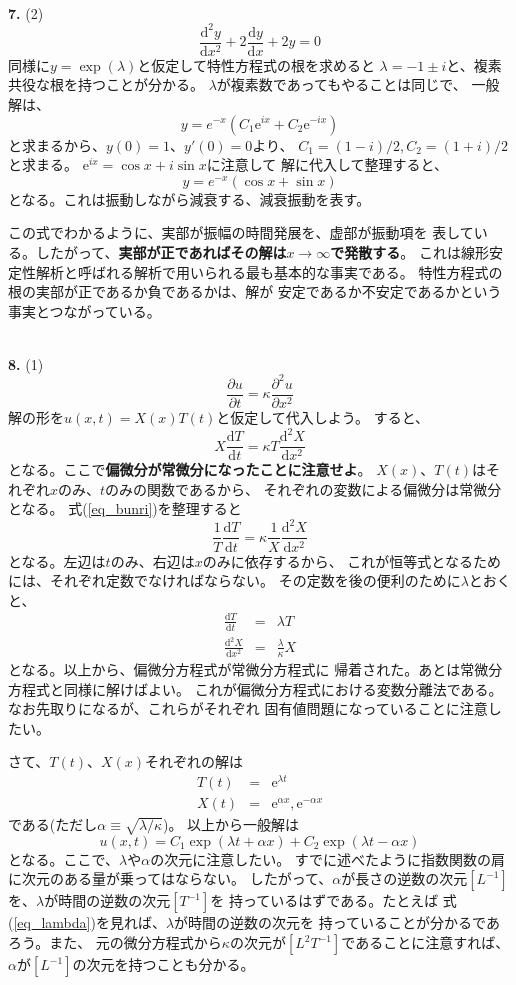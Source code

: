 \documentclass{jarticle}
\newcommand{\diff}{\mathrm d}
\newcommand{\ans}[2]{\noindent\\ {\bf \large #1.} (#2)}
\newcommand{\e}{\mathrm e}
\begin{document}
\ans{7}{2}
$$
  \frac{\diff^2 y}{\diff x^2} + 2 \frac{\diff y}{\diff x} + 2y = 0
$$
同様に$y = \exp(\lambda)$と仮定して特性方程式の根を求めると
$\lambda = -1 \pm i$と、複素共役な根を持つことが分かる。
$\lambda$が複素数であってもやることは同じで、
一般解は、
$$
  y = e^{-x} \left(C_1 \e^{ix} + C_2 \e^{-ix} \right)
$$
と求まるから、$y(0) = 1$、$y'(0) = 0$より、
$C_1 = (1-i)/2, C_2 = (1+i)/2$と求まる。
$\e^{ix} = \cos x + i \sin x$に注意して
解に代入して整理すると、
$$
  y = e^{-x} \left( \cos x + \sin x \right)
$$
となる。これは振動しながら減衰する、減衰振動を表す。

この式でわかるように、実部が振幅の時間発展を、虚部が振動項を
表している。したがって、{\bf 実部が正であればその解は$x \rightarrow \infty$で発散する}。
これは線形安定性解析と呼ばれる解析で用いられる最も基本的な事実である。
特性方程式の根の実部が正であるか負であるかは、解が
安定であるか不安定であるかという事実とつながっている。

\ans{8}{1}
$$ \frac{\partial u}{\partial t} =  \kappa \frac{\partial^2 u}{\partial x^2} $$
解の形を$u(x,t) = X(x)T(t)$と仮定して代入しよう。
すると、
\begin{equation}
  X \frac{\diff T}{\diff t} = \kappa T \frac{\diff^2 X}{\diff x^2}
  \label{eq_bunri}
\end{equation}
となる。ここで{\bf 偏微分が常微分になったことに注意せよ}。
$X(x)$、$T(t)$はそれぞれ$x$のみ、$t$のみの関数であるから、
それぞれの変数による偏微分は常微分となる。
式(\ref{eq_bunri})を整理すると
\begin{equation}
  \frac{1}{T} \frac{\diff T}{\diff t} = \kappa  \frac{1}{X} \frac{\diff^2 X}{\diff x^2}
\end{equation}
となる。左辺は$t$のみ、右辺は$x$のみに依存するから、
これが恒等式となるためには、それぞれ定数でなければならない。
その定数を後の便利のために$\lambda$とおくと、
\begin{eqnarray}
  \frac{\diff T}{\diff t} &= & \lambda T \label{eq_lambda} \\
  \frac{\diff^2 X}{\diff x^2} &= & \frac{\lambda}{\kappa} X
\end{eqnarray}
となる。以上から、偏微分方程式が常微分方程式に
帰着された。あとは常微分方程式と同様に解けばよい。
これが偏微分方程式における変数分離法である。
なお先取りになるが、これらがそれぞれ
固有値問題になっていることに注意したい。

さて、$T(t)$、$X(x)$それぞれの解は
\begin{eqnarray}
  T(t) &=& \e^{\lambda t}\\
  X(t) &=& \e^{\alpha x}, \e^{- \alpha x}
\end{eqnarray}
である(ただし$\alpha \equiv \sqrt{\lambda/\kappa}$)。
以上から一般解は
$$
  u(x,t) = C_1 \exp{(\lambda t + \alpha x)} + C_2 \exp{(\lambda t - \alpha x)}
$$
となる。ここで、$\lambda$や$\alpha$の次元に注意したい。
すでに述べたように指数関数の肩に次元のある量が乗ってはならない。
したがって、$\alpha$が長さの逆数の次元$[L^{-1}]$を、$\lambda$が時間の逆数の次元$[T^{-1}]$を
持っているはずである。たとえば
式(\ref{eq_lambda})を見れば、$\lambda$が時間の逆数の次元を
持っていることが分かるであろう。また、
元の微分方程式から$\kappa$の次元が$[L^2 T^{-1}]$であることに注意すれば、
$\alpha$が$[L^{-1}]$の次元を持つことも分かる。
\end{document}
